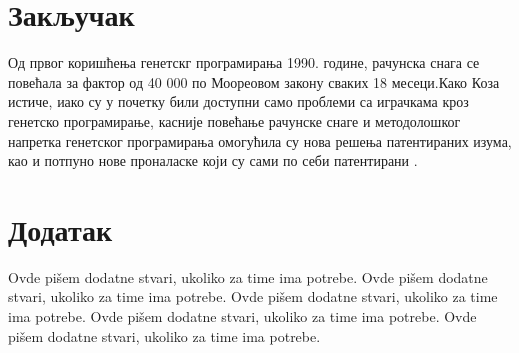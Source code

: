 \documentclass[a4paper]{article}
\begin{document}

% 
% 


\section{Закључак}
\label{sec:zakljucak}

Од првог коришћења генетскг програмирања 1990. године, рачунска снага се повећала за фактор од 40 000 по Моореовом закону сваких 18 месеци.Како Коза истиче, иако су у почетку били доступни само проблеми са играчкама кроз генетско програмирање, касније повећање рачунске снаге и методолошког напретка генетског програмирања омогућила су нова решења патентираних изума, као и потпуно нове проналаске који су сами по себи патентирани .

\appendix
 


\appendix
\section{Додатак}
Ovde pišem dodatne stvari, ukoliko za time ima potrebe.
Ovde pišem dodatne stvari, ukoliko za time ima potrebe.
Ovde pišem dodatne stvari, ukoliko za time ima potrebe.
Ovde pišem dodatne stvari, ukoliko za time ima potrebe.
Ovde pišem dodatne stvari, ukoliko za time ima potrebe.
\end{document}

